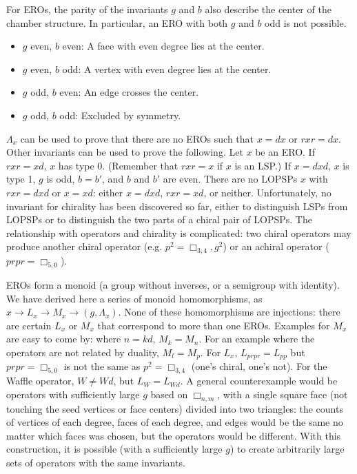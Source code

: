 \documentclass[12pt]{amsart}%
\begin{document}
For EROs, the parity of the invariants $g$ and $b$ also describe the center of the chamber structure.
In particular, an ERO with both $g$ and $b$ odd is not possible.
\begin{itemize}
  \item $g$ even, $b$ even: A face with even degree lies at the center.
  \item $g$ even, $b$ odd: A vertex with even degree lies at the center.
  \item $g$ odd, $b$ even: An edge crosses the center.
  \item $g$ odd, $b$ odd: Excluded by symmetry.
\end{itemize}

$\Lambda_x$ can be used to prove that there are no EROs such that
$x = dx$ or $rxr = dx$. Other invariants can be used to prove the following.
Let $x$ be an ERO. If $rxr=xd$, $x$ has type 0. (Remember that $rxr = x$ if
$x$ is an LSP.) If $x=dxd$, $x$ is type 1, $g$ is odd, $b=b'$, and $b$ and
$b'$ are even. There are no LOPSPs $x$ with
$rxr = dxd$ or $x=xd$: either $x = dxd$, $rxr = xd$, or neither.
Unfortunately, no invariant for chirality has been discovered so far, either
to distinguish LSPs from LOPSPs or to distinguish the two parts of a chiral
pair of LOPSPs. The relationship with operators and chirality is complicated:
two chiral operators may produce another chiral operator (e.g.
$p^2 = \Box_{3,4}, g^2$) or an achiral operator ($prpr = \Box_{5,0}$).

EROs form a monoid (a group without inverses, or a semigroup with identity).
We have derived here a series of monoid homomorphisms, as
$x \to L_x \to M_x \to (g, \Lambda_x)$. None of these homomorphisms are
injections: there are certain $L_x$ or $M_x$ that correspond to more than one
EROs. Examples for $M_x$ are easy to come by: where $n = kd$, $M_k = M_n$. For
an example where the operators are not related by duality, $M_l = M_p$. For
$L_x$, $L_{prpr} = L_{pp}$ but $prpr = \Box_{5,0}$ is not the same as $p^2 =
\Box_{3,4}$ (one's chiral, one's not). For the Waffle operator, $W \ne Wd$,
but $L_W = L_{Wd}$. A general counterexample would be operators with
sufficiently large $g$ based on $\Box_{n,m}$, with a single square face (not
touching the seed vertices or face centers) divided into two triangles: the
counts of vertices of each degree, faces of each degree, and edges would be
the same no matter which faces was chosen, but the operators would be
different. With this construction, it is possible (with a sufficiently large
$g$) to create arbitrarily large sets of operators with the same invariants.
\end{document}

